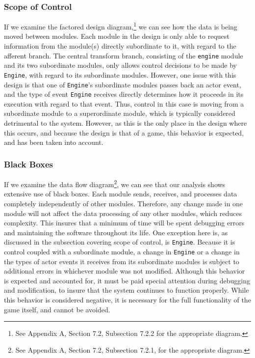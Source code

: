 \documentclass{article}
\begin{document}
		\subsubsection{Scope of Control}
			If we examine the factored design diagram,\footnote{See Appendix A, Section 7.2, Subsection 7.2.2 for the appropriate diagram.} we can see how the data is being moved between modules. Each module in the design is only able to request information from the module(s) directly subordinate to it, with regard to the afferent branch. The central transform branch, consisting of the \texttt{engine} module and its two subordinate modules, only allows control decisions to be made by \texttt{Engine}, with regard to its subordinate modules. However, one issue with this design is that one of \texttt{Engine}'s subordinate modules passes back an actor event, and the type of event \texttt{Engine} receives directly determines how it proceeds in its execution with regard to that event. Thus, control in this case is moving from a subordinate module to a superordinate module, which is typically considered detrimental to the system. However, as this is the only place in the design where this occurs, and because the design is that of a game, this behavior is expected, and has been taken into account. 
		\subsubsection{Black Boxes}
			If we examine the data flow diagram\footnote{See Appendix A, Section 7.2, Subsection 7.2.1, for the appropriate diagram.}, we can see that our analysis shows extensive use of black boxes. Each module sends, receives, and processes data completely independently of other modules. Therefore, any change made in one module will not affect the data processing of any other modules, which reduces complexity. This insures that a minimum of time will be spent debugging errors and maintaining the software throughout its life. One exception here is, as discussed in the subsection covering scope of control, is \texttt{Engine}. Because it is control coupled with a subordinate module, a change in \texttt{Engine} or a change in the types of actor events it receives from its subordinate modules is subject to additional errors in whichever module was not modified. Although this behavior is expected and accounted for, it must be paid special attention during debugging and modification, to insure that the system continues to function properly. While this behavior is considered negative, it is necessary for the full functionality of the game itself, and cannot be avoided.  
\end{document}
